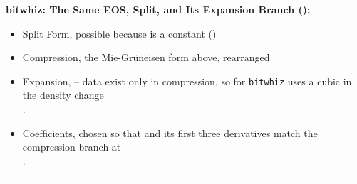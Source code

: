 \documentclass[11pt,addpoints]{exam}
\begin{document}
\clearpage

\begin{tcolorbox}[breakable]
\textbf{bitwhiz: The Same EOS, Split, and Its Expansion Branch ():}\vspace{.5em}
\begin{itemize}
\item Split Form, \hspace{3mm}  \hspace{5mm} possible because  is a constant \hspace{2mm} ()\vspace{.5em}
\item Compression, \hspace{3mm}  \hspace{5mm}  \hspace{7mm} the Mie-Gr\"uneisen form above, rearranged\vspace{.5em}
\item Expansion, \hspace{3mm} -- data exist only in compression, so for  \texttt{bitwhiz} uses a cubic in the density change \vspace{.5em}\\
.~~~~~~~~~~ \hspace{9mm} \vspace{1em}
\item Coefficients, \hspace{3mm} chosen so that \bm{$\Pi$} and its first three derivatives match the compression branch at \vspace{.5em}\\
.~~~~~~~~~~ \hspace{7mm} \vspace{1em}\\
.~~~~~~~~~~\vspace{1em}

\end{itemize}
\end{tcolorbox}
\end{document}
